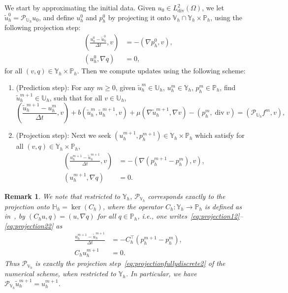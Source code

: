 \documentclass[10pt,letterpaper]{amsart}
\newcommand{\tu}{\widetilde{u}}
\newcommand{\Grad}{\nabla}
\newcommand{\Div}{\operatorname{div}}
\newcommand{\dom}{\Omega}
\newcommand{\Vh}{\mathbb{V}_h}
\newcommand{\Ph}{\mathbb{P}_h}
\newcommand{\Yh}{\mathbb{Y}_h}
\newcommand{\Uh}{\mathbb{U}_h}
\newcommand{\PUh}{\mathcal{P}_{\Uh}}
\newcommand{\PVh}{\mathcal{P}_{\Vh}}
\newtheorem{remark}[lemma]{Remark}
\theoremstyle{definition}{\newtheorem{definition}[lemma]{Definition}}
\numberwithin{equation}{section}
\begin{document}
We start by approximating the initial data. Given $u_0\in L^2_{\Div}(\dom)$, we let $\tu_h^{0} = \PUh u_0$,  and define $u_h^0$ and $p^0_h$ by projecting it onto $\Vh\cap \Yh\times\Ph$, 
using the following projection step:
\begin{align*}
	\left(\frac{u^{0}_h-\tu^{0}_h}{\Delta t }, v\right)&= -(\Grad p^{0}_h, v),\\
	\left(u^{0}_h,\Grad q\right)&=0,	
\end{align*}
for all $(v,q)\in \Yh\times \Ph$.
Then we compute updates using the following scheme:
\begin{enumerate}
	\item[{\bf Step 1}] (Prediction step):
	For any $m\geq 0$, given $\tu_h^m\in \Uh$, $ u_h^{m} \in \Yh$, $p_h^m\in \Ph$, find $\tu_h^{m+1} \in \Uh $, such that for all $v\in \Uh $,
		\begin{equation}
			\label{eq:step1fully2}
			\left(\frac{\tu^{m+1}_h-u^m_h}{\Delta t},v\right)+ b(\tu^m_h,\tu^{m+1}_h,v)+\mu(\Grad \tu_h^{m+1},\Grad v)-(p_h^m,\Div v)= (\PUh f^{m}, v),
		\end{equation}
		\item[{\bf Step 2}] (Projection step): Next we seek $(u^{m+1}_h,p^{m+1}_h)\in \Yh\times\Ph$ which satisfy for all $(v,q)\in \Yh\times\Ph$,
		\begin{subequations}
			\label{eq:projectionfullydiscrete2}
			\begin{align}
				\label{eq:projection12}
				\left(\frac{u^{m+1}_h-\tu^{m+1}_h}{\Delta t }, v\right)&= -(\Grad( p^{m+1}_h-p_h^m), v),\\%
				\label{eq:projection22}
				\left( u^{m+1}_h,\Grad q\right)&=0.
			\end{align}	
		\end{subequations}
	\end{enumerate}
\begin{remark}\label{rem:PVhonUh}
	We note that restricted to $\Yh$, $\PVh$ corresponds exactly to the projection onto $\mathbb{H}_h= \ker(C_h)$, where the operator $C_h:\Yh\to \Ph$ is defined as in~\cite{Guermond1998}, by $(C_h u,q)=(u,\Grad q)$ for all $q\in \Ph$, i.e., one writes~\eqref{eq:projection12}--\eqref{eq:projection22} as
	\begin{equation*}
		\begin{split}
			\frac{u^{m+1}_h-\tu^{m+1}_h}{\Delta t } & = -C_h^\top (p^{m+1}_h-p_h^m),\\
			C_h u^{m+1}_h & = 0.
		\end{split}
	\end{equation*}
		 Thus $\PVh$ is exactly the projection step~\eqref{eq:projectionfullydiscrete2} of the numerical scheme, when restricted to $\Yh$. In particular, we have $\PVh \tu_h^{m+1} = u^{m+1}_h$. 
\end{remark}
\end{document}
